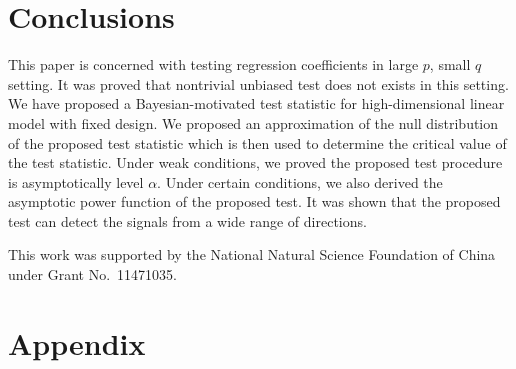 \documentclass[smallextended]{svjour3}       %
\begin{document}
\section{Conclusions}\label{sec:conclusions}
This paper is concerned with testing regression coefficients in large $p$, small $q$ setting.
It was proved that nontrivial unbiased test does not exists in this setting.
We have proposed a Bayesian-motivated test statistic for high-dimensional linear model with fixed design.
We proposed an approximation of the null distribution of the proposed test statistic which is then used to determine the critical value of the test statistic.
Under weak conditions, we proved the proposed test procedure is asymptotically level $\alpha$.
Under certain conditions, we also derived the asymptotic power function of the proposed test.
It was shown that the proposed test can detect the signals from a wide range of directions.

%






\begin{acknowledgements}
This work was supported by the National Natural Science Foundation of China under Grant No.\ 11471035.
\end{acknowledgements}




\appendix
\section*{Appendix}
\end{document}
